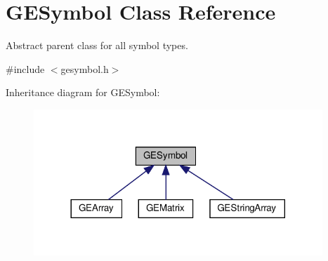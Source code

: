\hypertarget{class_g_e_symbol}{}\section{G\+E\+Symbol Class Reference}
\label{class_g_e_symbol}


Abstract parent class for all symbol types.  




{\ttfamily \#include $<$gesymbol.\+h$>$}



Inheritance diagram for G\+E\+Symbol\+:\nopagebreak
\begin{figure}[H]
\begin{center}
\leavevmode
\includegraphics[width=308pt]{class_g_e_symbol__inherit__graph}
\end{center}
\end{figure}
